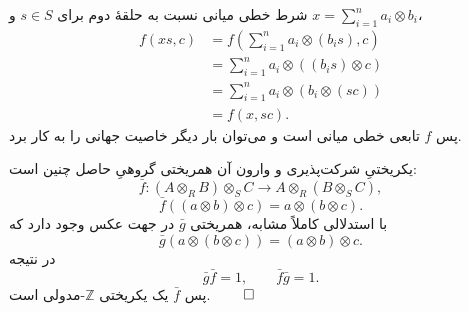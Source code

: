 \begin{frame}[t]{شرط خطی میانی نسبت به حلقهٔ دوم}
\label{lec20:associativity-s-balance}
برای \(s\in S\) و \(x=\sum_{i=1}^n a_i\otimes b_i\)،
\[
\begin{aligned}
f(xs,c)
 &=f\left(\sum_{i=1}^n a_i\otimes(b_is),c\right)\\
 &=\sum_{i=1}^n a_i\otimes((b_is)\otimes c)\\
 &=\sum_{i=1}^n a_i\otimes(b_i\otimes(sc))\\
 &=f(x,sc).
\end{aligned}
\]
پس \(f\) تابعی خطی میانی است و می‌توان بار دیگر خاصیت جهانی را به کار برد.
\end{frame}

\begin{frame}[t]{یکریختیِ شرکت‌پذیری و وارون آن}
\label{lec20:associator-inverse}
همریختی گروهیِ حاصل چنین است:
\[
    \bar f:(A\otimes_R B)\otimes_S C\longrightarrow A\otimes_R(B\otimes_S C),
\]
\[
    \bar f((a\otimes b)\otimes c)=a\otimes(b\otimes c).
\]
با استدلالی کاملاً مشابه، همریختی \(\bar g\) در جهت عکس وجود دارد که
\[
    \bar g(a\otimes(b\otimes c))=(a\otimes b)\otimes c.
\]
در نتیجه
\[
    \bar g\bar f=1,\qquad\bar f\bar g=1.
\]
پس \(\bar f\) یک یکریختی \(\mathbb Z\)-مدولی است. \hfill\(\qed\)
\end{frame}
